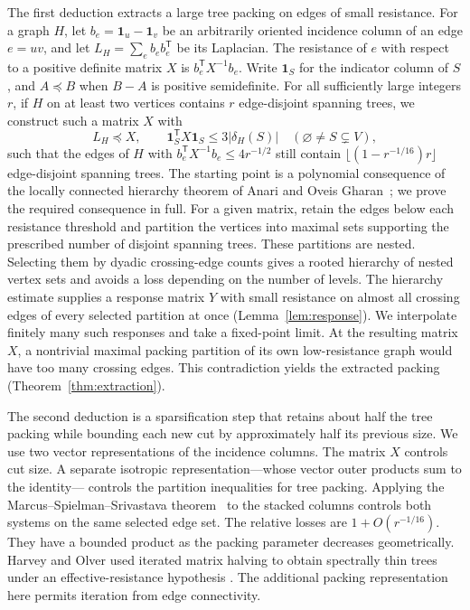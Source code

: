 The first deduction extracts a large tree packing on edges of small
resistance. For a graph \(H\), let \(b_e=\mathbf1_u-\mathbf1_v\)
be an arbitrarily oriented incidence column of an edge \(e=uv\),
and let \(L_H=\sum_e b_eb_e^{\mathsf T}\) be its Laplacian.
The resistance of \(e\) with respect to a positive definite matrix
\(X\) is \(b_e^{\mathsf T}X^{-1}b_e\).
Write \(\mathbf1_S\) for the indicator column of \(S\), and
\(A\preceq B\) when \(B-A\) is positive semidefinite.
For all sufficiently large integers \(r\), if \(H\) on at least
two vertices contains \(r\) edge-disjoint spanning trees, we
construct such a matrix \(X\) with
\[
 L_H\preceq X,\qquad
 \mathbf1_S^{\mathsf T}X\mathbf1_S
 \le3|\delta_H(S)|
 \quad(\varnothing\ne S\subsetneq V),
\]
such that the edges of \(H\) with
\(b_e^{\mathsf T}X^{-1}b_e\le4r^{-1/2}\) still contain
\(\lfloor(1-r^{-1/16})r\rfloor\) edge-disjoint spanning trees.
The starting point is a polynomial consequence of the locally connected
hierarchy theorem of Anari and Oveis Gharan~\cite[Theorem~3.5]{AOG};
we prove the required consequence in full.
For a given matrix, retain the edges below each resistance threshold
and partition the vertices into maximal sets supporting the prescribed
number of disjoint spanning trees. These partitions are nested.
Selecting them by dyadic crossing-edge counts gives a rooted hierarchy
of nested vertex sets and avoids a loss depending on the number of
levels. The hierarchy estimate supplies a response matrix \(Y\) with
small resistance on almost all crossing edges of every selected
partition at once (Lemma~\ref{lem:response}). We interpolate finitely
many such responses and take a fixed-point limit. At the resulting
matrix \(X\), a nontrivial maximal packing partition of its own
low-resistance graph would have too many crossing edges. This
contradiction yields the extracted packing
(Theorem~\ref{thm:extraction}).

The second deduction is a sparsification step that retains about half
the tree packing while bounding each new cut by approximately half its
previous size. We use two vector representations of the incidence
columns. The matrix \(X\) controls cut size. A separate isotropic
representation---whose vector outer products sum to the identity---
controls the partition inequalities for tree packing.
Applying the Marcus--Spielman--Srivastava theorem~\cite{MSS} to the stacked
columns controls both systems on the same selected edge set.
The relative losses are \(1+O(r^{-1/16})\). They have a bounded product
as the packing parameter decreases geometrically.
Harvey and Olver used iterated matrix halving to obtain spectrally thin
trees under an effective-resistance hypothesis
\cite[Appendix~F]{HarveyOlver2014}. The additional packing
representation here permits iteration from edge connectivity.

